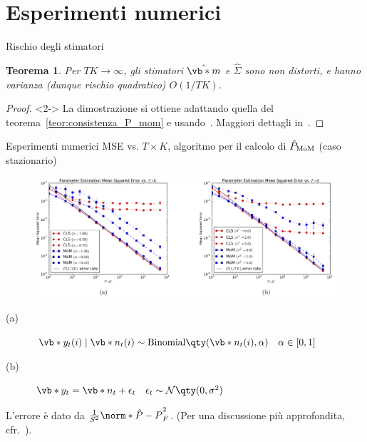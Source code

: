\documentclass[10pt,xcolor={table,dvipsnames}]{beamer} 		%
\theoremstyle{plain}					%
\newtheorem{teorema}{Teorema}%
\theoremstyle{definition}
\theoremstyle{remark}
\begin{document}
  
\section{Esperimenti numerici}
    \begin{frame}{Rischio degli stimatori}
        \begin{teorema}
            Per $TK\to\infty$, gli stimatori $\hat{\vb*{m}}$ e $\hat{\Sigma}$ sono non distorti, e hanno varianza (dunque rischio quadratico) $O(1/TK)$. 
        \end{teorema}
        \begin{proof}<2->
            La dimostrazione si ottiene adattando quella del teorema~\ref{teor:consistenza_P_mom} e usando~\cite[12-12 (p.~528)]{book:Papoulis}. Maggiori dettagli in~\cite{article:main}.
        \end{proof}
        \medskip

        
    \end{frame}

    \begin{frame}
        {Esperimenti numerici}
        {MSE vs. \texorpdfstring{$T\times K$}{TxK}, algoritmo per il calcolo di $\hat{P}_{\textup{MoM}}$ {\smaller (caso stazionario)}}
        \begin{figure}[ht]
			\centering
			\includegraphics[width=\textwidth]{Immagini/mom_cls_results_authors.png}
		\end{figure}
        \begin{description}
            \item[(a)] $\vb*{y}_t(i)\mid\vb*{n}_t(i)\sim\mathrm{Binomial}\qty(\vb*{n}_t(i),\alpha)\quad\alpha\in[0,1]$
            \item[(b)] $\vb*{y}_t=\vb*{n}_t+\epsilon_t\quad\epsilon_t\sim\mathcal{N}\qty(0,\sigma^2)$
        \end{description}

        L'errore è dato da $\frac{1}{S^2}\norm*{\hat{P}-P}_F^2$.         
        {\smaller (Per una discussione più approfondita, cfr.~\cite{article:main})}.
    \end{frame}
\end{document}
